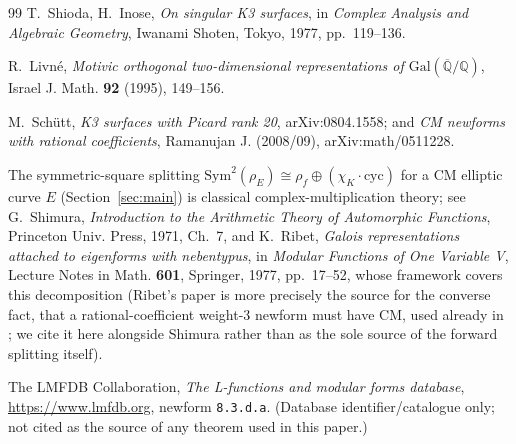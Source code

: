 \documentclass[11pt]{amsart}
\theoremstyle{definition}
\begin{document}
\begin{thebibliography}{99}
T.~Shioda, H.~Inose, \emph{On singular K3 surfaces}, in \emph{Complex Analysis and Algebraic Geometry}, Iwanami Shoten, Tokyo, 1977, pp.~119--136.

R.~Livn\'e, \emph{Motivic orthogonal two-dimensional representations of $\mathrm{Gal}(\overline{\mathbb Q}/\mathbb Q)$}, Israel J. Math. \textbf{92} (1995), 149--156.

M.~Sch\"utt, \emph{K3 surfaces with Picard rank 20}, arXiv:0804.1558; and \emph{CM newforms with rational coefficients}, Ramanujan J. (2008/09), arXiv:math/0511228.

The symmetric-square splitting $\mathrm{Sym}^2(\rho_E)\cong\rho_f\oplus(\chi_K\cdot\mathrm{cyc})$ for a CM elliptic curve $E$ (Section~\ref{sec:main}) is classical complex-multiplication theory; see G.~Shimura, \emph{Introduction to the Arithmetic Theory of Automorphic Functions}, Princeton Univ. Press, 1971, Ch.~7, and K.~Ribet, \emph{Galois representations attached to eigenforms with nebentypus}, in \emph{Modular Functions of One Variable V}, Lecture Notes in Math. \textbf{601}, Springer, 1977, pp.~17--52, whose framework covers this decomposition (Ribet's paper is more precisely the source for the converse fact, that a rational-coefficient weight-3 newform must have CM, used already in \cite{Schutt2010}; we cite it here alongside Shimura rather than as the sole source of the forward splitting itself).

The LMFDB Collaboration, \emph{The L-functions and modular forms database}, \url{https://www.lmfdb.org}, newform \texttt{8.3.d.a}. (Database identifier/catalogue only; not cited as the source of any theorem used in this paper.)

\end{thebibliography}
\end{document}

